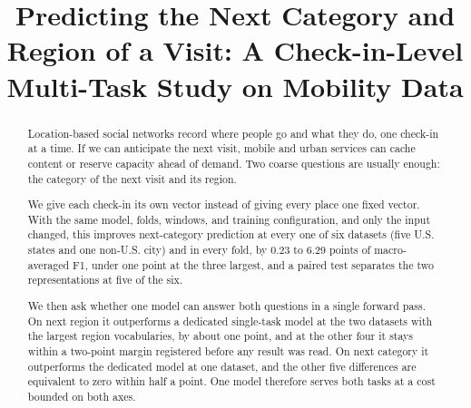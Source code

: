 \documentclass[conference]{IEEEtran}
\begin{document}
\title{Predicting the Next Category and Region of a Visit:
A Check-in-Level Multi-Task Study on Mobility Data}

\author{
\and
{}
\and
{}
}

\maketitle
{}

\begin{abstract}
Location-based social networks record where people go and what they do, one check-in at a time.
If we can anticipate the next visit, mobile and urban services can cache content or reserve
capacity ahead of demand. Two coarse questions are usually enough: the category of the next visit
and its region.

We give each check-in its own vector instead of giving every place one fixed vector. With the same
model, folds, windows, and training configuration, and only the input changed, this improves next-category prediction at
every one of six datasets (five U.S. states and one non-U.S. city) and in every fold, by 0.23 to 6.29 points of macro-averaged F1, under
one point at the three largest, and a paired test separates the two representations at five of the
six.

We then ask whether one model can answer both questions in a single forward pass. On next region it outperforms a dedicated single-task model at the two datasets with the
largest region vocabularies, by about one point, and at the other four it stays within a two-point
margin registered before any result was read. On next category it
outperforms the dedicated model at one dataset, and the other five differences are equivalent to
zero within half a point. One model therefore serves both tasks at a cost bounded on both axes.
\end{abstract}
\end{document}
